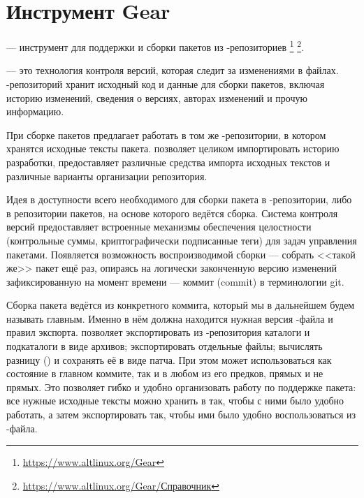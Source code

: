 \hypertarget{4}{\chapter{Инструмент Gear}}\label{chapter-gear}
 --- 
инструмент для поддержки и сборки пакетов из -репозиториев%
\footnote{\href{https://www.altlinux.org/Gear}{https://www.altlinux.org/Gear}}%
\footnote{\href{https://www.altlinux.org/Gear/\%D0\%A1\%D0\%BF\%D1\%80\%D0\%B0\%D0\%B2\%D0\%BE\%D1\%87\%D0\%BD\%D0\%B8\%D0\%BA}{https://www.altlinux.org/Gear/Справочник}}.


 --- это технология контроля версий, которая следит за изменениями в файлах. 
-репозиторий хранит исходный код и данные для сборки пакетов, включая историю 
изменений, сведения о версиях, авторах изменений и прочую информацию. 

При сборке пакетов  предлагает работать в том же -репозитории, 
в котором хранятся исходные тексты пакета.  позволяет целиком импортировать 
историю разработки, предоставляет различные средства импорта исходных текстов и 
различные варианты организации репозитория. 

Идея  в доступности всего необходимого для сборки пакета в -репозитории, 
либо в репозитории пакетов, на основе которого ведётся сборка. Система контроля версий 
 предоставляет встроенные механизмы обеспечения целостности (контрольные суммы, 
криптографически подписанные теги) для задач управления пакетами. Появляется возможность 
воспроизводимой сборки --- собрать <<такой же>> пакет ещё раз, опираясь на логически 
законченную версию изменений зафиксированную на момент времени --- коммит (commit) в 
терминологии git.

Сборка пакета ведётся из конкретного коммита, который мы в дальнейшем будем называть главным. 
Именно в нём должна находится нужная версия -файла и правил экспорта.  
позволяет экспортировать из -репозитория каталоги и подкаталоги в виде архивов; 
экспортировать отдельные файлы; вычислять разницу () и сохранять её в виде патча. 
При этом может использоваться как состояние в главном коммите, так и в любом из его предков, 
прямых и не прямых. Это позволяет гибко и удобно организовать работу по поддержке пакета: 
все нужные исходные тексты можно хранить в  так, чтобы с ними было удобно работать, 
а затем экспортировать так, чтобы ими было удобно воспользоваться из -файла.

